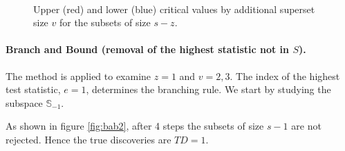 \documentclass[11pt,a4paper,openright,twoside]{article}
\begin{document}
\newpage
\begin{figure}
\centering
{}\\
\quad {}
\caption{Upper (red) and lower (blue) critical values by additional superset size $v$ for the subsets of size $s-z$.}
\end{figure}

\vspace{3mm}

\paragraph{Branch and Bound (removal of the highest statistic not in $S$).} The method is applied to examine $z=1$ and $v=2,3$. The index of the highest test statistic, $e=1$, determines the branching rule. We start by studying the subspace $\mathbb{S}_{-1}$.

As shown in figure \ref{fig:bab2}, after 4 steps the subsets of size $s-1$ are not rejected. Hence the true discoveries are $TD=1$.
\end{document}

